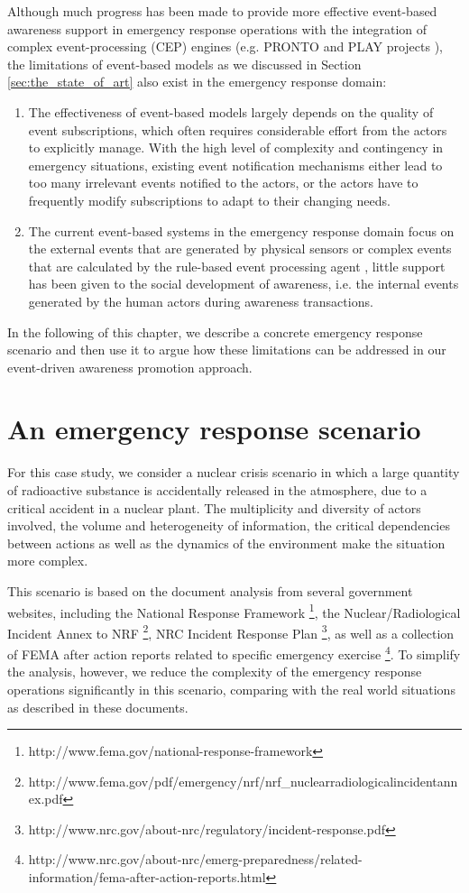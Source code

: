 Although much progress has been made to provide more effective event-based awareness support in emergency response operations with the integration of complex event-processing (CEP) engines (e.g. PRONTO \cite{Pottebaum2011} and PLAY projects \cite{Truptil2012}), the limitations of event-based models as we discussed in Section \ref{sec:the_state_of_art} also exist in the emergency response domain: 

\begin{enumerate}
	\item The effectiveness of event-based models largely depends on the quality of event subscriptions, which often requires considerable effort from the actors to explicitly manage. With the high level of complexity and contingency in emergency situations, existing event notification mechanisms either lead to too many irrelevant events notified to the actors, or the actors have to frequently modify subscriptions to adapt to their changing needs.
	\item The current event-based systems in the emergency response domain focus on the external events that are generated by physical sensors or complex events that are calculated by the rule-based event processing agent \cite{Pottebaum2011}, little support has been given to the social development of awareness, i.e. the internal events generated by the human actors during awareness transactions.
\end{enumerate}

In the following of this chapter, we describe a concrete emergency response scenario and then use it to argue how these limitations can be addressed in our event-driven awareness promotion approach.

\section{An emergency response scenario} %
\label{sec:an_emergency_response_scenario}
For this case study, we consider a nuclear crisis scenario in which a large quantity of radioactive substance is accidentally released in the atmosphere, due to a critical accident in a nuclear plant. The multiplicity and diversity of actors involved, the volume and heterogeneity of information, the critical dependencies between actions as well as the dynamics of the environment make the situation more complex. 

This scenario is based on the document analysis from several government websites, including the National Response Framework \footnote{http://www.fema.gov/national-response-framework}, the Nuclear/Radiological Incident Annex to NRF \footnote{http://www.fema.gov/pdf/emergency/nrf/nrf\_nuclearradiologicalincidentannex.pdf}, NRC Incident Response Plan \footnote{http://www.nrc.gov/about-nrc/regulatory/incident-response.pdf}, as well as a collection of FEMA after action reports related to specific emergency exercise \footnote{http://www.nrc.gov/about-nrc/emerg-preparedness/related-information/fema-after-action-reports.html}. To simplify the analysis, however, we reduce the complexity of the emergency response operations significantly in this scenario, comparing with the real world situations as described in these documents.

